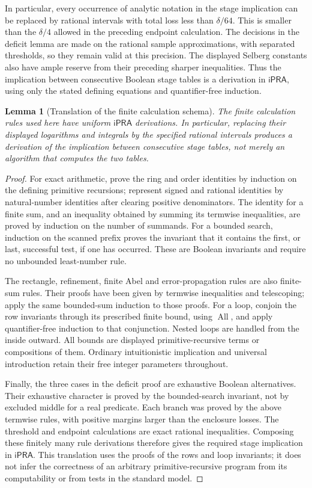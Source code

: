 \documentclass[11pt]{article}
\newtheorem{lemma}[theorem]{Lemma}
\theoremstyle{definition}
\theoremstyle{remark}
\newcommand{\ipra}{\mathsf{iPRA}}
\begin{document}
In particular, every occurrence of analytic notation in the stage implication
can be replaced by rational intervals with total loss less than
$\delta/64$. This is smaller than the $\delta/4$ allowed in the preceding
endpoint calculation. The decisions in the deficit lemma are made on the
rational sample approximations, with separated thresholds, so they remain
valid at this precision. The displayed Selberg constants also have ample
reserve from their preceding sharper inequalities. Thus the implication
between consecutive Boolean stage tables is a derivation in $\ipra$,
using only the stated defining equations and quantifier-free induction.

\begin{lemma}[Translation of the finite calculation schema]\label{lem:translation}
The finite calculation rules used here have uniform $\ipra$ derivations.
In particular, replacing their displayed logarithms and integrals by the
specified rational intervals produces a derivation of the implication
between consecutive stage tables, not merely an algorithm that computes
the two tables.
\end{lemma}
\begin{proof}
For exact arithmetic, prove the ring and order identities by induction on
the defining primitive recursions; represent signed and rational identities
by natural-number identities after clearing positive denominators.
The identity for a finite sum, and an inequality obtained by summing its
termwise inequalities, are proved by induction on the number of summands.
For a bounded search, induction on the scanned prefix proves the invariant
that it contains the first, or last, successful test, if one has occurred.
These are Boolean invariants and require no unbounded least-number rule.

The rectangle, refinement, finite Abel and error-propagation rules are also
finite-sum rules. Their proofs have been given by termwise inequalities and
telescoping; apply the same bounded-sum induction to those proofs. For a
loop, conjoin the row invariants through its prescribed finite bound,
using $\operatorname{All}$, and apply quantifier-free induction to that
conjunction. Nested loops are handled from the inside outward. All bounds
are displayed primitive-recursive terms or compositions of them. Ordinary
intuitionistic implication and universal introduction retain their free
integer parameters throughout.

Finally, the three cases in the deficit proof are exhaustive Boolean
alternatives. Their exhaustive character is proved by the bounded-search
invariant, not by excluded middle for a real predicate. Each branch was
proved by the above termwise rules, with positive margins larger than the
enclosure losses. The threshold and endpoint calculations are exact
rational inequalities. Composing these finitely many rule derivations
therefore gives the required stage implication in $\ipra$.
This translation uses the proofs of the rows and loop invariants; it does
not infer the correctness of an arbitrary primitive-recursive program from
its computability or from tests in the standard model.
\end{proof}
\end{document}
